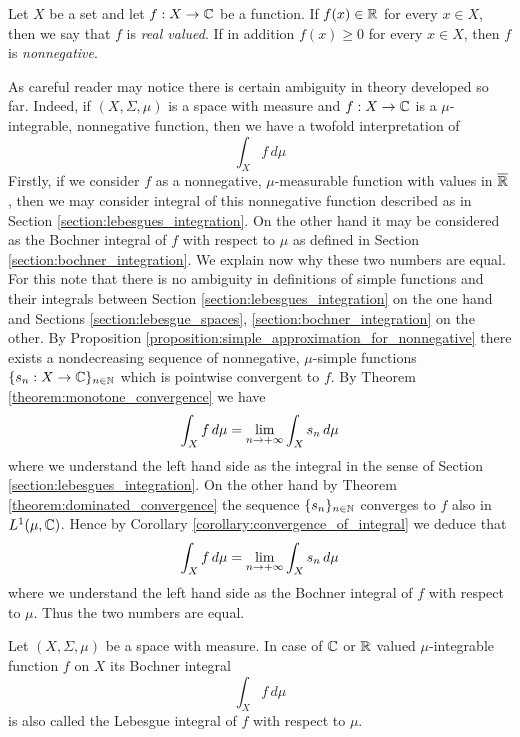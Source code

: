 \begin{definition}
    Let $X$ be a set and let $f:X\rightarrow {\mathbb C}$ be a function. If $f(x)\in {\mathbb R}$ for every $x\in X$, then we say that $f$ is \textit{real valued}. If in addition $f(x)\geq 0$ for every $x\in X$, then $f$ is \textit{nonnegative}.
\end{definition}
\noindent
As careful reader may notice there is certain ambiguity in theory developed so far. Indeed, if $(X,\Sigma,\mu)$ is a space with measure and $f:X\rightarrow {\mathbb C}$ is a $\mu$-integrable, nonnegative function, then we have a twofold interpretation of
$$\int_Xf\,d\mu$$
Firstly, if we consider $f$ as a nonnegative, $\mu$-measurable function with values in $\overline{{\mathbb R}}$, then we may consider integral of this nonnegative function described as in Section \ref{section:lebesgues_integration}. On the other hand it may be considered as the Bochner integral of $f$ with respect to $\mu$ as defined in Section \ref{section:bochner_integration}. We explain now why these two numbers are equal. For this note that there is no ambiguity in definitions of simple functions and their integrals between Section \ref{section:lebesgues_integration} on the one hand and Sections \ref{section:lebesgue_spaces}, \ref{section:bochner_integration} on the other. By Proposition \ref{proposition:simple_approximation_for_nonnegative} there exists a nondecreasing sequence of nonnegative, $\mu$-simple functions $\{s_n:X\rightarrow {\mathbb C}\}_{n\in {\mathbb N}}$ which is pointwise convergent to $f$. By Theorem \ref{theorem:monotone_convergence} we have
$$\int_Xf\,d\mu = \lim_{n\rightarrow +\infty}\int_Xs_n\,d\mu$$
where we understand the left hand side as the integral in the sense of Section \ref{section:lebesgues_integration}. On the other hand by Theorem \ref{theorem:dominated_convergence} the sequence $\{s_n\}_{n\in {\mathbb N}}$ converges to $f$ also in $L^1(\mu,{\mathbb C})$. Hence by Corollary \ref{corollary:convergence_of_integral} we deduce that
$$\int_Xf\,d\mu = \lim_{n\rightarrow +\infty}\int_Xs_n\,d\mu$$
where we understand the left hand side as the Bochner integral of $f$ with respect to $\mu$. Thus the two numbers are equal.

Let $(X,\Sigma, \mu)$ be a space with measure. In case of ${\mathbb C}$ or ${\mathbb R}$ valued $\mu$-integrable function $f$ on $X$ its Bochner integral
$$\int_X f\,d\mu$$
is also called the Lebesgue integral of $f$ with respect to $\mu$.






\small



